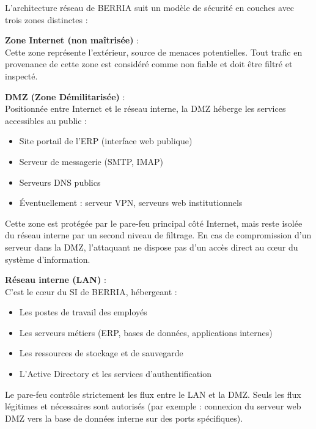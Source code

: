 \noindent L'architecture réseau de BERRIA suit un modèle de sécurité en couches avec trois zones distinctes :

\medskip

\noindent \textbf{Zone Internet (non maîtrisée)} :\\
Cette zone représente l'extérieur, source de menaces potentielles. Tout trafic en provenance de cette zone est considéré comme non fiable et doit être filtré et inspecté.

\medskip

\noindent \textbf{DMZ (Zone Démilitarisée)} :\\
Positionnée entre Internet et le réseau interne, la DMZ héberge les services accessibles au public :
\begin{itemize}
  \item Site portail de l'ERP (interface web publique)
  \item Serveur de messagerie (SMTP, IMAP)
  \item Serveurs DNS publics
  \item Éventuellement : serveur VPN, serveurs web institutionnels
\end{itemize}

\noindent Cette zone est protégée par le pare-feu principal côté Internet, mais reste isolée du réseau interne par un second niveau de filtrage. En cas de compromission d'un serveur dans la DMZ, l'attaquant ne dispose pas d'un accès direct au cœur du système d'information.

\medskip

\noindent \textbf{Réseau interne (LAN)} :\\
C'est le cœur du SI de BERRIA, hébergeant :
\begin{itemize}
  \item Les postes de travail des employés
  \item Les serveurs métiers (ERP, bases de données, applications internes)
  \item Les ressources de stockage et de sauvegarde
  \item L'Active Directory et les services d'authentification
\end{itemize}

\noindent Le pare-feu contrôle strictement les flux entre le LAN et la DMZ. Seuls les flux légitimes et nécessaires sont autorisés (par exemple : connexion du serveur web DMZ vers la base de données interne sur des ports spécifiques).

\newpage

